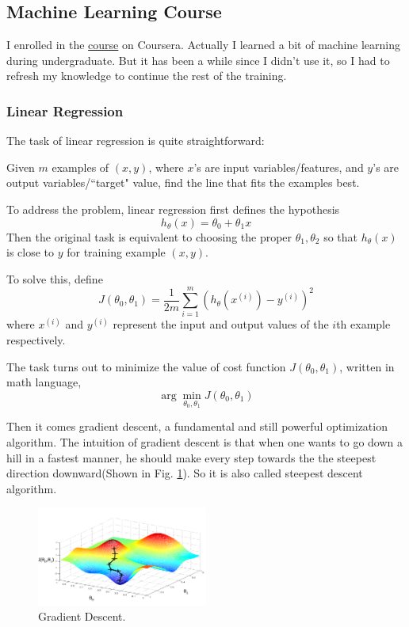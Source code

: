 \documentclass{article} %
\begin{document}

\subsection{Machine Learning Course}
I enrolled in the \href{https://www.coursera.org/learn/machine-learning}{course} on Coursera. Actually I learned a bit of machine learning during undergraduate. But it has been a while since I didn't use it, so I had to refresh my knowledge to continue the rest of the training.

\subsubsection{Linear Regression}
The task of linear regression is quite straightforward:

Given $m$ examples of $(x,y)$, where $x$'s are input variables/features, and $y$'s are output variables/``target" value, find the line that fits the examples best.

To address the problem, linear regression first defines the hypothesis
$$h_\theta(x)=\theta_0+\theta_1 x$$
Then the original task is equivalent to choosing the proper $\theta_1,\theta_2$ so that $h_\theta(x)$ is close to $y$ for training example $(x,y)$.

To solve this, define
$$J(\theta_0, \theta_1)=\frac{1}{2m}\sum_{i=1}^m (h_\theta(x^{(i)}) - y^{(i)})^2$$
where $x^{(i)}$ and $y^{(i)}$ represent the input and output values of the $i$th example respectively.

 The task turns out to minimize the value of cost function $J(\theta_0,\theta_1)$, written in math language, $$\arg\min_{\theta_0,\theta_1} J(\theta_0,\theta_1)$$

Then it comes gradient descent, a fundamental and still powerful optimization algorithm. The intuition of gradient descent is that when one wants to go down a hill in a fastest manner, he should make every step towards the the steepest direction downward(Shown in Fig. \ref{fig:gd}). So it is also called steepest descent algorithm.

\begin{figure}[H]
\centering
\includegraphics[width=0.5\textwidth]{gd.png}
\caption{Gradient Descent.}
\label{fig:gd}
\end{figure}
\end{document}
